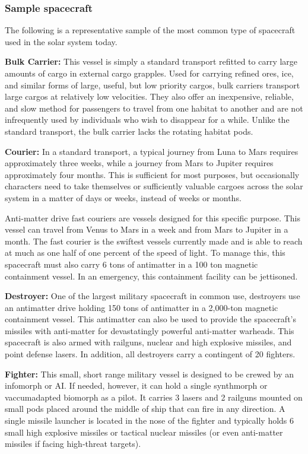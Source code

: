 \subsubsection{Sample spacecraft} 

The following is a representative sample of the most common type of spacecraft used in the solar system today. 

\textbf{Bulk Carrier:} This vessel is simply a standard transport refitted to carry large amounts of cargo in external cargo grapples. Used for carrying refined ores, ice, and similar forms of large, useful, but low priority cargos, bulk carriers transport large cargos at relatively low velocities. They also offer an inexpensive, reliable, and slow method for passengers to travel from one habitat to another and are not infrequently used by individuals who wish to disappear for a while. Unlike the standard transport, the bulk carrier lacks the rotating habitat pods. 

\textbf{Courier:} In a standard transport, a typical journey from Luna to Mars requires approximately three weeks, while a journey from Mars to Jupiter requires approximately four months. This is sufficient for most purposes, but occasionally characters need to take themselves or sufficiently valuable cargoes across the solar system in a matter of days or weeks, instead of weeks or months. 

Anti-matter drive fast couriers are vessels designed for this specific purpose. This vessel can travel from Venus to Mars in a week and from Mars to Jupiter in a month. The fast courier is the swiftest vessels currently made and is able to reach at much as one half of one percent of the speed of light. To manage this, this spacecraft must also carry 6 tons of antimatter in a 100 ton magnetic containment vessel. In an emergency, this containment facility can be jettisoned. 

\textbf{Destroyer:} One of the largest military spacecraft in common use, destroyers use an antimatter drive holding 150 tons of antimatter in a 2,000-ton magnetic containment vessel. This antimatter can also be used to provide the spacecraft’s missiles with anti-matter for devastatingly powerful anti-matter warheads. This spacecraft is also armed with railguns, nuclear and high explosive missiles, and point defense lasers. In addition, all destroyers carry a contingent of 20 fighters. 

\textbf{Fighter:} This small, short range military vessel is designed to be crewed by an infomorph or AI. If needed, however, it can hold a single synthmorph or vaccumadapted biomorph as a pilot. It carries 3 lasers and 2 railguns mounted on small pods placed around the middle of ship that can fire in any direction. A single missile launcher is located in the nose of the fighter and typically holds 6 small high explosive missiles or tactical nuclear missiles (or even anti-matter missiles if facing high-threat targets). 

